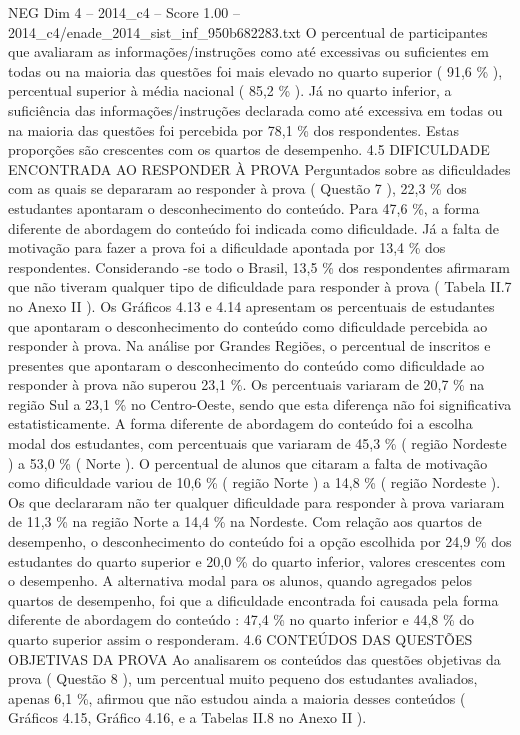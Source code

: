 \begin{textsample}{NEG Dim 4 – 2014\_c4 – Score 1.00 – 2014\_c4/enade\_2014\_sist\_inf\_950b682283.txt}
O percentual de participantes que avaliaram as informações/instruções como até excessivas ou suficientes em todas ou na maioria das questões foi mais elevado no quarto superior ( 91,6 \% ), percentual superior à média nacional ( 85,2 \% ).
Já no quarto inferior, a suficiência das informações/instruções declarada como até excessiva em todas ou na maioria das questões foi percebida por 78,1 \% dos respondentes.
Estas proporções são crescentes com os quartos de desempenho. 4.5 DIFICULDADE ENCONTRADA AO RESPONDER À PROVA Perguntados sobre as dificuldades com as quais se depararam ao responder à prova ( Questão 7 ), 22,3 \% dos estudantes apontaram o desconhecimento do conteúdo.
Para 47,6 \%, a forma diferente de abordagem do conteúdo foi indicada como dificuldade.
Já a falta de motivação para fazer a prova foi a dificuldade apontada por 13,4 \% dos respondentes.
Considerando -se todo o Brasil, 13,5 \% dos respondentes afirmaram que não tiveram qualquer tipo de dificuldade para responder à prova ( Tabela II.7 no Anexo II ).
Os Gráficos 4.13 e 4.14 apresentam os percentuais de estudantes que apontaram o desconhecimento do conteúdo como dificuldade percebida ao responder à prova.
Na análise por Grandes Regiões, o percentual de inscritos e presentes que apontaram o desconhecimento do conteúdo como dificuldade ao responder à prova não superou 23,1 \%.
Os percentuais variaram de 20,7 \% na região Sul a 23,1 \% no Centro-Oeste, sendo que esta diferença não foi significativa estatisticamente.
A forma diferente de abordagem do conteúdo foi a escolha modal dos estudantes, com percentuais que variaram de 45,3 \% ( região Nordeste ) a 53,0 \% ( Norte ).
O percentual de alunos que citaram a falta de motivação como dificuldade variou de 10,6 \% ( região Norte ) a 14,8 \% ( região Nordeste ).
Os que declararam não ter qualquer dificuldade para responder à prova variaram de 11,3 \% na região Norte a 14,4 \% na Nordeste.
Com relação aos quartos de desempenho, o desconhecimento do conteúdo foi a opção escolhida por 24,9 \% dos estudantes do quarto superior e 20,0 \% do quarto inferior, valores crescentes com o desempenho.
A alternativa modal para os alunos, quando agregados pelos quartos de desempenho, foi que a dificuldade encontrada foi causada pela forma diferente de abordagem do conteúdo : 47,4 \% no quarto inferior e 44,8 \% do quarto superior assim o responderam. 4.6 CONTEÚDOS DAS QUESTÕES OBJETIVAS DA PROVA Ao analisarem os conteúdos das questões objetivas da prova ( Questão 8 ), um percentual muito pequeno dos estudantes avaliados, apenas 6,1 \%, afirmou que não estudou ainda a maioria desses conteúdos ( Gráficos 4.15, Gráfico 4.16, e a Tabelas II.8 no Anexo II ).

\end{textsample}
